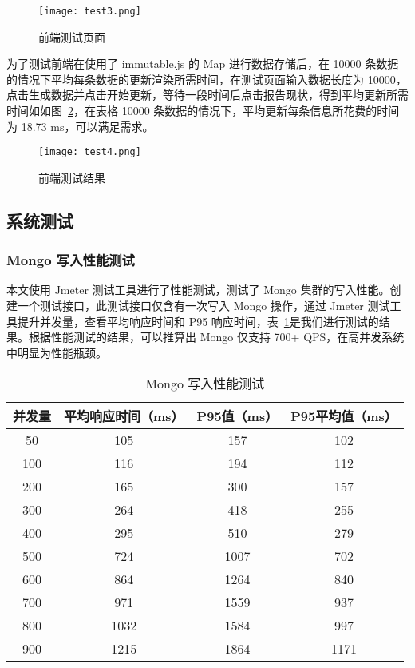 \begin{figure}[!htp]
    \centering
    \texttt{[image: test3.png]}
    \caption{前端测试页面}
    \label{fig:test3}
  \end{figure}

  为了测试前端在使用了 immutable.js 的 Map 进行数据存储后，在 10000 条数据的情况下平均每条数据的更新渲染所需时间，在测试页面输入数据长度为 10000，点击生成数据并点击开始更新，等待一段时间后点击报告现状，得到平均更新所需时间如如图~\ref{fig:test4}，在表格 10000 条数据的情况下，平均更新每条信息所花费的时间为 18.73 ms，可以满足需求。

  \begin{figure}[!htp]
    \centering
    \texttt{[image: test4.png]}
    \caption{前端测试结果}
    \label{fig:test4}
  \end{figure}

  \subsection{系统测试}
  \subsubsection{Mongo 写入性能测试}
  本文使用 Jmeter 测试工具进行了性能测试，测试了 Mongo 集群的写入性能。创建一个测试接口，此测试接口仅含有一次写入 Mongo 操作，通过 Jmeter 测试工具提升并发量，查看平均响应时间和 P95 响应时间，表~\ref{fig:test5}是我们进行测试的结果。根据性能测试的结果，可以推算出 Mongo 仅支持 700+ QPS，在高并发系统中明显为性能瓶颈。
  \begin{table}[h!]
    \begin{center}
      \caption{Mongo 写入性能测试}
      \label{fig:test5}
      \begin{tabular}{ c c c c }
        \hline
        \textbf{并发量} & \textbf{平均响应时间（ms）
        } & \textbf{P95值（ms）
        } & \textbf{P95平均值（ms）
        } \\
        \hline
        50 & 105 & 157 & 102 \\
        100 & 116 & 194 & 112 \\
        200 & 165 & 300 & 157 \\
        300 & 264 & 418 & 255 \\
        400 & 295 & 510 & 279 \\
        500 & 724 & 1007 & 702 \\
        600 & 864 & 1264 & 840 \\
        700 & 971 & 1559 & 937 \\
        800 & 1032 & 1584 & 997 \\
        900 & 1215 & 1864 & 1171 \\
        \hline
      \end{tabular}
    \end{center}
  \end{table}

